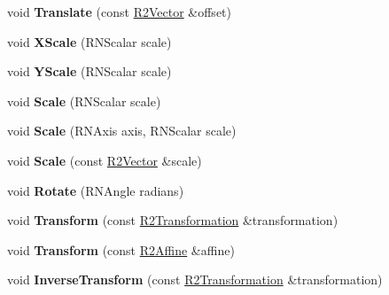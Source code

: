 \begin{DoxyCompactItemize}
\item 
void {\bfseries Translate} (const \hyperlink{class_r2_vector}{R2\+Vector} \&offset)\hypertarget{class_r2_affine_a689090e063e450da204aa3e6dc41e2cd}{}\label{class_r2_affine_a689090e063e450da204aa3e6dc41e2cd}

\item 
void {\bfseries X\+Scale} (R\+N\+Scalar scale)\hypertarget{class_r2_affine_a9f3886954ae9f0129be639b7b1906140}{}\label{class_r2_affine_a9f3886954ae9f0129be639b7b1906140}

\item 
void {\bfseries Y\+Scale} (R\+N\+Scalar scale)\hypertarget{class_r2_affine_a0d45f20d91b865d0af4c0efcc33d43ac}{}\label{class_r2_affine_a0d45f20d91b865d0af4c0efcc33d43ac}

\item 
void {\bfseries Scale} (R\+N\+Scalar scale)\hypertarget{class_r2_affine_a958c4f2955f734b5aece7b96694bf394}{}\label{class_r2_affine_a958c4f2955f734b5aece7b96694bf394}

\item 
void {\bfseries Scale} (R\+N\+Axis axis, R\+N\+Scalar scale)\hypertarget{class_r2_affine_a64a6f469fa92c4d38e65fd7f09475a80}{}\label{class_r2_affine_a64a6f469fa92c4d38e65fd7f09475a80}

\item 
void {\bfseries Scale} (const \hyperlink{class_r2_vector}{R2\+Vector} \&scale)\hypertarget{class_r2_affine_ae18b7a8a7ca203d4dbfe940c0c704833}{}\label{class_r2_affine_ae18b7a8a7ca203d4dbfe940c0c704833}

\item 
void {\bfseries Rotate} (R\+N\+Angle radians)\hypertarget{class_r2_affine_a667d5c45bcf9fe1a8b31c4aecf5ed929}{}\label{class_r2_affine_a667d5c45bcf9fe1a8b31c4aecf5ed929}

\item 
void {\bfseries Transform} (const \hyperlink{class_r2_transformation}{R2\+Transformation} \&transformation)\hypertarget{class_r2_affine_adfc10a572683a580a460f0e1b0072d82}{}\label{class_r2_affine_adfc10a572683a580a460f0e1b0072d82}

\item 
void {\bfseries Transform} (const \hyperlink{class_r2_affine}{R2\+Affine} \&affine)\hypertarget{class_r2_affine_a43899898abe9d4d95cd895decdc55495}{}\label{class_r2_affine_a43899898abe9d4d95cd895decdc55495}

\item 
void {\bfseries Inverse\+Transform} (const \hyperlink{class_r2_transformation}{R2\+Transformation} \&transformation)\hypertarget{class_r2_affine_a85e30d8df0dd0a1c7b9971cc0bed2e59}{}\label{class_r2_affine_a85e30d8df0dd0a1c7b9971cc0bed2e59}


\end{DoxyCompactItemize}
